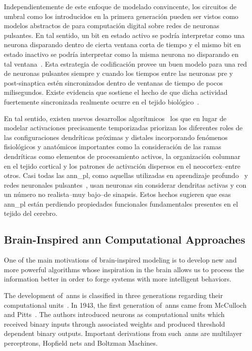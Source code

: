 {Independientemente de este enfoque de modelado convincente, los circuitos de umbral como los introducidos en la primera generación pueden ser vistos como modelos abstractos de para computación digital sobre redes de neuronas pulsantes.
En tal sentido, un bit en estado activo se podría interpretar como una neurona disparando dentro de cierta ventana corta de tiempo y el mismo bit en estado inactivo se podría interpretar como la misma neurona no disparando en tal ventana~\cite{Valiant:1994:CM:199266}.
Esta estrategia de codificación provee un buen modelo para una red de neuronas pulsantes siempre y cuando los tiempos entre las neuronas pre y post-sinaptica estén sincronizados dentro de ventanas de tiempo de pocos milisegundos.
Existe evidencia que sostiene el hecho de que dicha actividad fuertemente sincronizada realmente ocurre en el tejido biológico~\cite{Abeles1993SpatiotemporalFP,bair1994}.

En tal sentido, existen nuevos desarrollos algorítmicos~\cite{10.3389/fncir.2016.00023,10.1371/journal.pone.0217966} los que en lugar de modelar activaciones precisamente temporizadas priorizan los diferentes roles de las configuraciones dendríticas próximas y distales incorporando fenómenos fisiológicos y anatómicos importantes como la consideración de las ramas dendríticas como elementos de procesamiento activos, la organización columnar en el tejido cortical y los patrones de activación dispersos en el neocortex--entre otros.
Casi todas las \gls{ann_pl}, como aquellas utilizadas en aprendizaje profundo~\cite{lecun_deep_2015} y redes neuronales pulsantes~\cite{MAASS19971659}, usan neuronas sin considerar dendritas activas y con un número no realista--muy bajo--de sinapsis.
Estos hechos sugieren que esas \gls{ann_pl} están perdiendo propiedades funcionales fundamentales presentes en el tejido del cerebro.
}{
\subsection{Brain-Inspired \gls{ann} Computational Approaches}

One of the main motivations of brain-inspired modeling is to develop new and more powerful algorithms whose inspiration in the brain allows us to process the information better in order to forge systems with more intelligent behaviors.

The development of~\glspl{ann} is classified in three generations regarding their computational units~\cite{MAASS19971659,10.1007/978-3-642-03156-4_17}. In 1943, the first generation of~\glspl{ann} came from McCulloch and Pitts~\cite{McCulloch1990ALC}. The authors introduced neurons as computational units which received binary inputs through associated weights and produced threshold dependent binary outputs. Important derivations from such~\glspl{ann} are multilayer perceptrons, Hopfield nets and Boltzman Machines.

}
